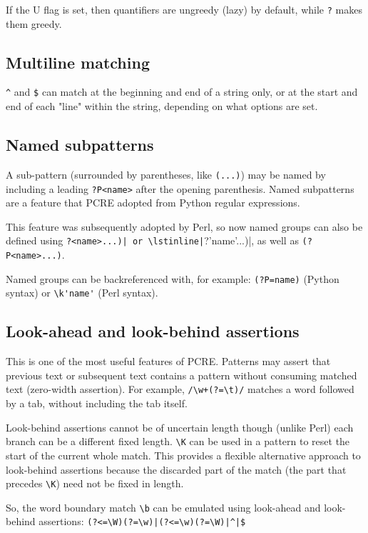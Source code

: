 If the U flag is set, then quantifiers are ungreedy (lazy) by default, while \lstinline|?| makes them greedy.

\subsection{Multiline matching}

\lstinline|^| and \lstinline|$| can match at the beginning and end of a string only, or at the start and end of each "line" within the string, depending on what options are set.

\subsection{Named subpatterns}

A sub-pattern (surrounded by parentheses, like \lstinline|(...)|) may be named by including a leading \lstinline|?P<name>| after the opening parenthesis. Named subpatterns are a feature that PCRE adopted from Python regular expressions.

This feature was subsequently adopted by Perl, so now named groups can also be defined using \lstinline(?<name>...)| or \lstinline|(?'name'...)|, as well as \lstinline|(?P<name>...)|.

Named groups can be backreferenced with, for example:
\lstinline|(?P=name)| (Python syntax) or
\lstinline|\k'name'| (Perl syntax).

\subsection{Look-ahead and look-behind assertions}

This is one of the most useful features of PCRE. Patterns may assert that previous text or subsequent text contains a pattern without consuming matched text (zero-width assertion). For example, \lstinline|/\w+(?=\t)/| matches a word followed by a tab, without including the tab itself.

Look-behind assertions cannot be of uncertain length though (unlike Perl) each branch can be a different fixed length.
\lstinline|\K| can be used in a pattern to reset the start of the current whole match. This provides a flexible alternative approach to look-behind assertions because the discarded part of the match (the part that precedes \lstinline|\K|) need not be fixed in length.

So, the word boundary match \lstinline|\b| can be emulated using look-ahead and look-behind assertions: \lstinline:(?<=\W)(?=\w)|(?<=\w)(?=\W)|^|$:

